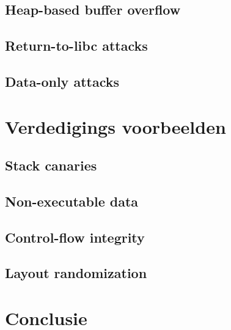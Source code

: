 \documentclass[../main.tex]{subfiles}
\begin{document}
\subsection{Heap-based buffer overflow}

\subsection{Return-to-libc attacks}
\subsection{Data-only attacks}
\section{Verdedigings voorbeelden}
\subsection{Stack canaries}
\subsection{Non-executable data}
\subsection{Control-flow integrity}
\subsection{Layout randomization}
\section{Conclusie}
\end{document}
